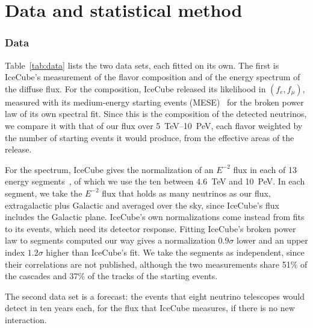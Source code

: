\documentclass[linenumbers, aps, prd, twocolumn, superscriptaddress, floatfix, longbibliography, nofootinbib, bibnotes]{revtex4-2}
\begin{document}
\section{Data and statistical method}
\label{sec:data}

\subsubsection{Data}
Table~\ref{tab:data} lists the two data sets, each fitted on its own.
The first is IceCube's measurement of the flavor composition and of the energy spectrum of the diffuse flux.
For the composition, IceCube released its likelihood in $(f_e, f_\mu)$, measured with its medium-energy starting events (MESE)~\cite{IceCube:2025ole} for the broken power law of its own spectral fit.
Since this is the composition of the detected neutrinos, we compare it with that of our flux over 5~TeV--10~PeV, each flavor weighted by the number of starting events it would produce, from the effective areas of the release.

For the spectrum, IceCube gives the normalization of an $E^{-2}$ flux in each of 13 energy segments~\cite{IceCube:2025ewu}, of which we use the ten between 4.6~TeV and 10~PeV.
In each segment, we take the $E^{-2}$ flux that holds as many neutrinos as our flux, extragalactic plus Galactic and averaged over the sky, since IceCube's flux includes the Galactic plane.
IceCube's own normalizations come instead from fits to its events, which need its detector response.
Fitting IceCube's broken power law to segments computed our way gives a normalization $0.9\sigma$ lower and an upper index $1.2\sigma$ higher than IceCube's fit.
We take the segments as independent, since their correlations are not published, although the two measurements share 51\% of the cascades and 37\% of the tracks of the starting events.

The second data set is a forecast: the events that eight neutrino telescopes would detect in ten years each, for the flux that IceCube measures, if there is no new interaction.
\end{document}
